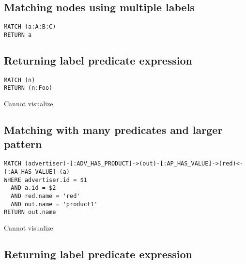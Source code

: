 \subsection{Matching nodes using multiple labels}

\begin{lstlisting}
MATCH (a:A:B:C)
RETURN a
\end{lstlisting}

\subsection{Returning label predicate expression}

\begin{lstlisting}
MATCH (n)
RETURN (n:Foo)
\end{lstlisting}

Cannot visualize
\subsection{Matching with many predicates and larger pattern}

\begin{lstlisting}
MATCH (advertiser)-[:ADV_HAS_PRODUCT]->(out)-[:AP_HAS_VALUE]->(red)<-[:AA_HAS_VALUE]-(a)
WHERE advertiser.id = $1
  AND a.id = $2
  AND red.name = 'red'
  AND out.name = 'product1'
RETURN out.name
\end{lstlisting}

Cannot visualize
\subsection{Returning label predicate expression}

